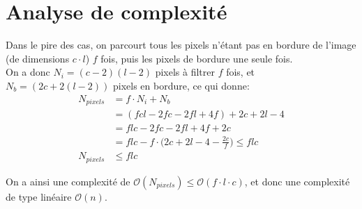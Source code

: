 \documentclass[a4paper, 11pt]{article}
\begin{document}
\section*{Analyse de complexité}
Dans le pire des cas, on parcourt tous les pixels n'étant pas en bordure de l'image (de dimensions $c\cdot l$) $f$ fois, puis les pixels de bordure une seule fois.\\

On a donc $N_i = (c - 2)(l-2)$ pixels à filtrer $f$ fois, et $N_b = (2c + 2(l-2))$ pixels en bordure, ce qui donne:
\begin{align}
N_{pixels} &= f \cdot N_i + N_b \nonumber \\
 &= (fcl-2fc-2fl+4f) + 2c+2l-4\nonumber \\
&= flc - 2fc - 2fl + 4f + 2c \nonumber \\
&= flc - f \cdot \bigg(2c + 2l - 4 - \frac{2c}{f}\bigg) \leq flc \nonumber \\
N_{pixels} &\leq flc \nonumber
\end{align}

On a ainsi une complexité de $\mathcal{O}(N_{pixels}) \leq \mathcal{O}(f\cdot l\cdot c)$, et donc une complexité de type linéaire $\mathcal{O}(n)$.
\end{document}
